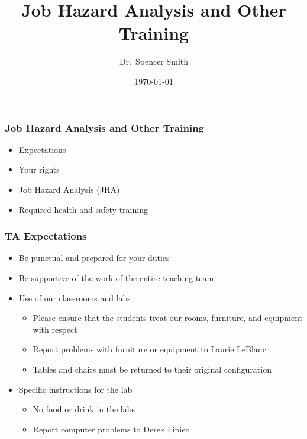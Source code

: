 \documentclass[handout]{beamer} %
\title[Job Hazard Analysis (slide \thepage)]{Job Hazard Analysis and Other Training}
\author[Smith]{Dr.~Spencer Smith}
\institute{Faculty of Engineering, McMaster University}
\date{\today}
\begin{document}

\maketitle



\begin{frame}
\frametitle{Job Hazard Analysis and Other Training}

\begin{itemize}

\item Expectations
\item Your rights
\item Job Hazard Analysis (JHA)
\item Required health and safety training

\end{itemize}

\end{frame}


\begin{frame}
\frametitle{TA Expectations}

\begin{itemize}

\item Be punctual and prepared for your duties
\item Be supportive of the work of the entire teaching team
\item Use of our classrooms and labs
\begin{itemize}
\item Please ensure that the students treat our rooms, furniture, and equipment with respect
\item Report problems with furniture or equipment to Laurie LeBlanc
\item Tables and chairs must be returned to their original configuration
\end{itemize}
\item Specific instructions for the lab
\begin{itemize}
\item No food or drink in the labs
\item Report computer problems to Derek Lipiec
\end{itemize}

\end{itemize}

\end{frame}
\end{document}
